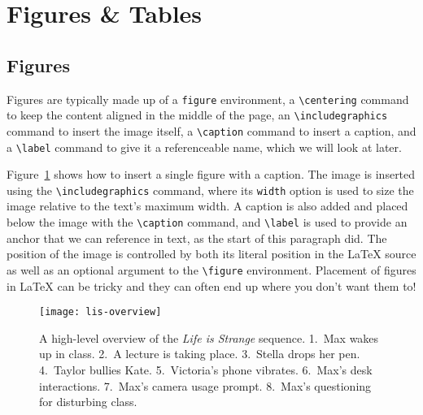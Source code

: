 
\section{Figures \& Tables}%
\label{sec:basics-figures_and_tables}%

\subsection*{Figures}%
Figures are typically made up of a \verb|figure| environment, a \verb|\centering| command to keep the content aligned in the middle of the page, an \verb|\includegraphics| command to insert the image itself, a \verb|\caption| command to insert a caption, and a \verb|\label| command to give it a referenceable name, which we will look at later.

Figure~\ref{fig:basics-skyrim_book} shows how to insert a single figure with a caption.
The image is inserted using the \verb|\includegraphics| command, where its \verb|width| option is used to size the image relative to the text's maximum width.
A caption is also added and placed below the image with the \verb|\caption| command, and \verb|\label| is used to provide an anchor that we can reference in text, as the start of this paragraph did.
The position of the image is controlled by both its literal position in the \LaTeX{} source as well as an optional argument to the \verb|\figure| environment.
Placement of figures in \LaTeX{} can be tricky and they can often end up where you don't want them to!

\begin{figure}[!htbp]
  \centering
  \texttt{[image: lis-overview]}
  \caption{A high-level overview of the \textit{Life is Strange} sequence. 1.\ Max wakes up in class. 2.\ A lecture is taking place. 3.\ Stella drops her pen. 4.\ Taylor bullies Kate. 5.\ Victoria's phone vibrates. 6.\ Max's desk interactions. 7.\ Max's camera usage prompt. 8.\ Max's questioning for disturbing class.}%
  \label{fig:basics-skyrim_book}
\end{figure}

